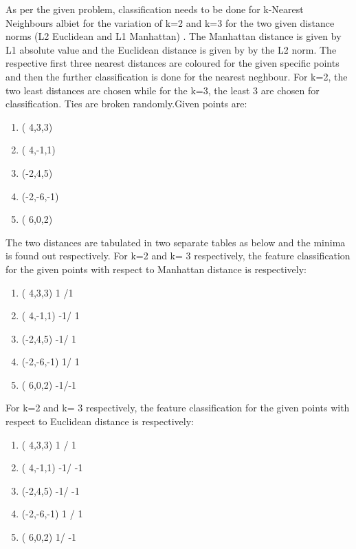 

As per the given problem, classification needs to be done for k-Nearest Neighbours albiet for the variation of k=2 and k=3 for the two given distance norms (L2 Euclidean and L1 Manhattan) . The Manhattan distance is given by L1 absolute value and the Euclidean distance is given by by the L2 norm.
 The respective first three nearest distances are coloured for the given specific points and then the further classification is done for the nearest neghbour. For k=2, the two least distances are chosen while for the k=3, the least 3 are chosen for classification. Ties are broken randomly.Given points are:
\begin {enumerate}
	\item( 4,3,3)   
	\item( 4,-1,1)  
	\item(-2,4,5)   
	\item(-2,-6,-1) 
	\item( 6,0,2)  
\end {enumerate}
The two distances are tabulated in two separate tables as below and the minima is found out respectively.
For k=2 and k= 3 respectively, the feature classification for the given points with respect to Manhattan distance is respectively:
\begin {enumerate}
	\item( 4,3,3)      1 /1
	\item( 4,-1,1)    -1/ 1
	\item(-2,4,5)     -1/ 1
	\item(-2,-6,-1)    1/ 1
	\item( 6,0,2)      -1/-1
\end {enumerate}
For k=2 and k= 3 respectively, the feature classification for the given points with respect to Euclidean distance is respectively:
\begin {enumerate}
	\item( 4,3,3)     1 /  1
	\item( 4,-1,1)   -1/ -1
	\item(-2,4,5)    -1/ -1
	\item(-2,-6,-1)   1 / 1
	\item( 6,0,2)      1/ -1
\end {enumerate}
